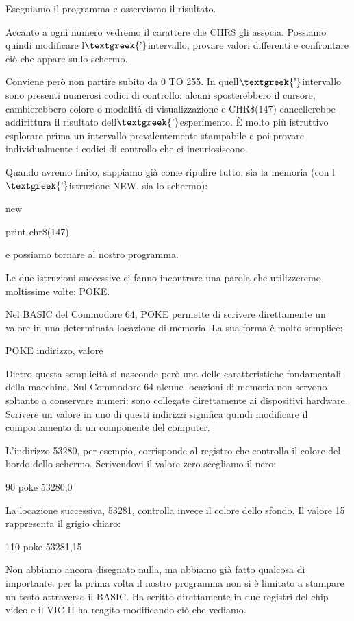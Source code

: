\documentclass{article}
\begin{document}
Eseguiamo il programma e osserviamo il risultato.

Accanto a ogni numero vedremo il carattere che CHR\$ gli associa. Possiamo quindi modificare
l$\text{\textgreek{’}}$intervallo, provare valori differenti e confrontare ciò che appare sullo schermo.

Conviene però non partire subito da 0 TO 255. In quell$\text{\textgreek{’}}$intervallo sono presenti numerosi codici di
controllo: alcuni sposterebbero il cursore, cambierebbero colore o modalità di visualizzazione e CHR\$(147)
cancellerebbe addirittura il risultato dell$\text{\textgreek{’}}$esperimento. È molto più istruttivo esplorare prima un
intervallo prevalentemente stampabile e poi provare individualmente i codici di controllo che ci incuriosiscono.

Quando avremo finito, sappiamo già come ripulire tutto, sia la memoria (con l$\text{\textgreek{’}}$istruzione NEW, sia
lo schermo):

new

print chr\$(147)

e possiamo tornare al nostro programma.

Le due istruzioni successive ci fanno incontrare una parola che utilizzeremo moltissime volte: POKE.

Nel BASIC del Commodore 64, POKE permette di scrivere direttamente un valore in una determinata locazione di memoria. La
sua forma è molto semplice:

POKE indirizzo, valore

Dietro questa semplicità si nasconde però una delle caratteristiche fondamentali della macchina. Sul Commodore 64 alcune
locazioni di memoria non servono soltanto a conservare numeri: sono collegate direttamente ai dispositivi hardware.
Scrivere un valore in uno di questi indirizzi significa quindi modificare il comportamento di un componente del
computer.

L'indirizzo 53280, per esempio, corrisponde al registro che controlla il colore del bordo dello schermo. Scrivendovi il
valore zero scegliamo il nero:

90 poke 53280,0

La locazione successiva, 53281, controlla invece il colore dello sfondo. Il valore 15 rappresenta il grigio chiaro:

110 poke 53281,15

Non abbiamo ancora disegnato nulla, ma abbiamo già fatto qualcosa di importante: per la prima volta il nostro programma
non si è limitato a stampare un testo attraverso il BASIC. Ha scritto direttamente in due registri del chip video e il
VIC-II ha reagito modificando ciò che vediamo.
\end{document}
